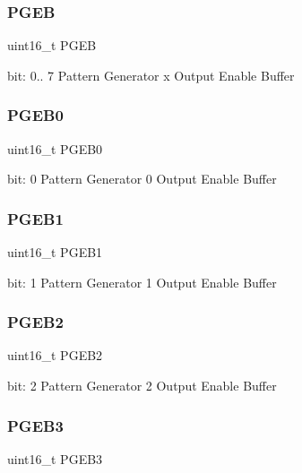 \subsubsection{\texorpdfstring{PGEB}{PGEB}}
{\footnotesize\ttfamily uint16\+\_\+t P\+G\+EB}

bit\+: 0.. 7 Pattern Generator x Output Enable Buffer \mbox{\label{union_t_c_c___p_a_t_t_b___type_a8588200484996495fcc1723e46246650}} 
\subsubsection{\texorpdfstring{PGEB0}{PGEB0}}
{\footnotesize\ttfamily uint16\+\_\+t P\+G\+E\+B0}

bit\+: 0 Pattern Generator 0 Output Enable Buffer \mbox{\label{union_t_c_c___p_a_t_t_b___type_af666764057cf7f908f7db8f9c1051d73}} 
\subsubsection{\texorpdfstring{PGEB1}{PGEB1}}
{\footnotesize\ttfamily uint16\+\_\+t P\+G\+E\+B1}

bit\+: 1 Pattern Generator 1 Output Enable Buffer \mbox{\label{union_t_c_c___p_a_t_t_b___type_ac282187c33dcd75622bfb962400250c6}} 
\subsubsection{\texorpdfstring{PGEB2}{PGEB2}}
{\footnotesize\ttfamily uint16\+\_\+t P\+G\+E\+B2}

bit\+: 2 Pattern Generator 2 Output Enable Buffer \mbox{\label{union_t_c_c___p_a_t_t_b___type_a4eeab7a44dafbe7d012acaeef5ed209b}} 
\subsubsection{\texorpdfstring{PGEB3}{PGEB3}}
{\footnotesize\ttfamily uint16\+\_\+t P\+G\+E\+B3}

